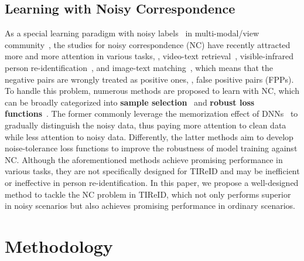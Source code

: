 \documentclass[10pt,twocolumn,letterpaper]{article}
\begin{document}
\subsection{Learning with Noisy Correspondence}
As a special learning paradigm with noisy labels~\cite{li2020dividemix,lu2022ensemble,Feng_2023_CVPR} in multi-modal/view community~\cite{hu2021learning,qin2023edmc,qin2023elastic,qin2023edmc,yang2022robust}, the studies for noisy correspondence (NC) have recently attracted more and more attention in various tasks, \eg, video-text retrieval~\cite{zhang2023robust}, visible-infrared person re-identification~\cite {yang2022learning,yang2024robust,lin2024multi}, and image-text matching~\cite{huang2021learning,qin2022deep}, which means that the negative pairs are wrongly treated as positive ones, \ie, false positive pairs (FPPs). To handle this problem, numerous methods are proposed to learn with NC, which can be broadly categorized into \textbf{sample selection}~\cite{huang2021learning,zhang2023robust,han2023noisy} and \textbf{robust loss functions}~\cite{yang2022learning,qin2022deep,hu2023cross,qin2023cross}. The former commonly leverage the memorization effect of DNNs~\cite{arpit2017closer} to gradually distinguish the noisy data, thus paying more attention to clean data while less attention to noisy data. Differently, the latter methods aim to develop noise-tolerance loss functions to improve the robustness of model training against NC. Although the aforementioned methods achieve promising performance in various tasks, they are not specifically designed for TIReID and may be inefficient or ineffective in person re-identification. In this paper, we propose a well-designed method to tackle the NC problem in TIReID, which not only performs superior in noisy scenarios but also achieves promising performance in ordinary scenarios.

\section{Methodology}
\end{document}
